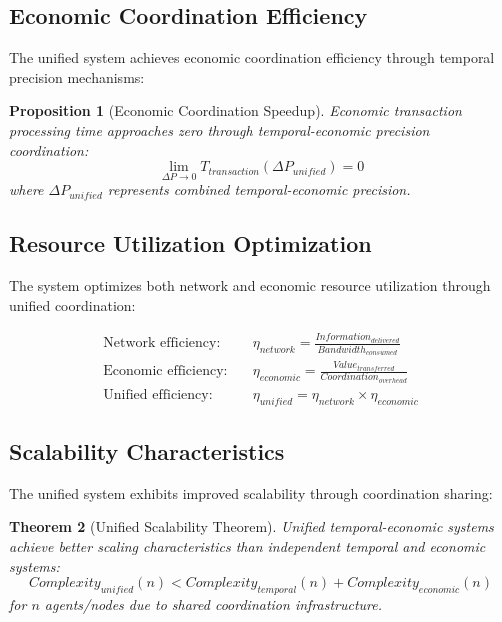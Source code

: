 \documentclass[12pt,a4paper]{article}
\newtheorem{theorem}{Theorem}[section]
\newtheorem{proposition}[theorem]{Proposition}
\begin{document}
\subsection{Economic Coordination Efficiency}

The unified system achieves economic coordination efficiency through temporal precision mechanisms:

\begin{proposition}[Economic Coordination Speedup]
Economic transaction processing time approaches zero through temporal-economic precision coordination:
\begin{equation}
\lim_{\Delta P \rightarrow 0} T_{transaction}(\Delta P_{unified}) = 0
\end{equation}
where $\Delta P_{unified}$ represents combined temporal-economic precision.
\end{proposition}

\subsection{Resource Utilization Optimization}

The system optimizes both network and economic resource utilization through unified coordination:

\begin{align}
\text{Network efficiency:} \quad &\eta_{network} = \frac{Information_{delivered}}{Bandwidth_{consumed}} \\
\text{Economic efficiency:} \quad &\eta_{economic} = \frac{Value_{transferred}}{Coordination_{overhead}} \\
\text{Unified efficiency:} \quad &\eta_{unified} = \eta_{network} \times \eta_{economic}
\end{align}

\subsection{Scalability Characteristics}

The unified system exhibits improved scalability through coordination sharing:

\begin{theorem}[Unified Scalability Theorem]
Unified temporal-economic systems achieve better scaling characteristics than independent temporal and economic systems:
\begin{equation}
Complexity_{unified}(n) < Complexity_{temporal}(n) + Complexity_{economic}(n)
\end{equation}
for $n$ agents/nodes due to shared coordination infrastructure.
\end{theorem}
\end{document}
